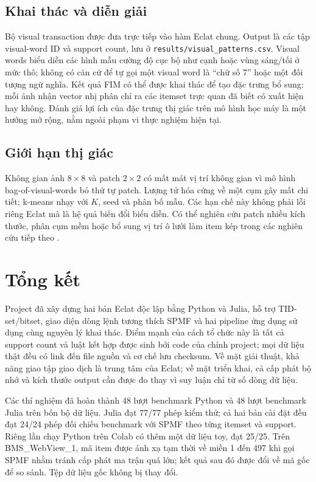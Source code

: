 \documentclass[conference,10pt]{IEEEtran}
\newcommand{\myitem}[1]{\texttt{#1}}
\begin{document}
\subsection{Khai thác và diễn giải}
Bộ visual transaction được đưa trực tiếp vào hàm Eclat chung. Output là các tập visual-word ID và support count, lưu ở \myitem{results/visual\_patterns.csv}. Visual words biểu diễn các hình mẫu cường độ cục bộ như cạnh hoặc vùng sáng/tối ở mức thô; không có căn cứ để tự gọi một visual word là ``chữ số 7'' hoặc một đối tượng ngữ nghĩa. Kết quả FIM có thể được khai thác để tạo đặc trưng bổ sung: mỗi ảnh nhận vector nhị phân chỉ ra các itemset trực quan đã biết có xuất hiện hay không. Đánh giá lợi ích của đặc trưng thị giác trên mô hình học máy là một hướng mở rộng, nằm ngoài phạm vi thực nghiệm hiện tại.

\subsection{Giới hạn thị giác}
Không gian ảnh $8\times8$ và patch $2\times2$ có mất mát vị trí không gian vì mô hình bag-of-visual-words bỏ thứ tự patch. Lượng tử hóa cứng về một cụm gây mất chi tiết; k-means nhạy với $K$, seed và phân bố mẫu. Các hạn chế này không phải lỗi riêng Eclat mà là hệ quả biến đổi biểu diễn. Có thể nghiên cứu patch nhiều kích thước, phân cụm mềm hoặc bổ sung vị trí ô lưới làm item kép trong các nghiên cứu tiếp theo \cite{sivic2003}.




\clearpage
\balance
\section{Tổng kết}
Project đã xây dựng hai bản Eclat độc lập bằng Python và Julia, hỗ trợ TID-set/bitset, giao diện dòng lệnh tương thích SPMF và hai pipeline ứng dụng sử dụng cùng nguyên lý khai thác. Điểm mạnh của cách tổ chức này là tất cả support count và luật kết hợp được sinh bởi code của chính project; mọi dữ liệu thật đều có link đến file nguồn và cơ chế lưu checksum. Về mặt giải thuật, khả năng giao tập giao dịch là trung tâm của Eclat; về mặt triển khai, cả cấp phát bộ nhớ và kích thước output cần được đo thay vì suy luận chỉ từ số dòng dữ liệu.

Các thí nghiệm đã hoàn thành 48 lượt benchmark Python và 48 lượt benchmark Julia trên bốn bộ dữ liệu. Julia đạt 77/77 phép kiểm thử; cả hai bản cài đặt đều đạt 24/24 phép đối chiếu benchmark với SPMF theo từng itemset và support. Riêng lần chạy Python trên Colab có thêm một dữ liệu toy, đạt 25/25. Trên BMS\_WebView\_1, mã item được ánh xạ tạm thời về miền 1 đến 497 khi gọi SPMF nhằm tránh cấp phát ma trận quá lớn; kết quả sau đó được đổi về mã gốc để so sánh. Tệp dữ liệu gốc không bị thay đổi.
\end{document}
